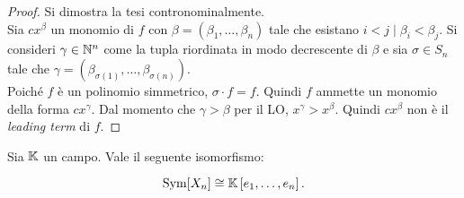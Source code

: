 \begin{proof}
    Si dimostra la tesi contronominalmente. \\
    
    Sia $c x^\beta$ un monomio di $f$ con $\beta = (\beta_1, \ldots, \beta_n)$ tale che esistano $i < j
    \mid \beta_i < \beta_j$. Si consideri $\gamma \in \mathbb N^n$ come
    la tupla riordinata in modo decrescente di $\beta$ e sia
    $\sigma \in S_n$ tale che $\gamma = (\beta_{\sigma(1)},
    \ldots, \beta_{\sigma(n)})$. \\
    
    Poiché $f$ è un polinomio simmetrico, $\sigma \cdot f = f$. Quindi
    $f$ ammette un monomio della forma $c x^\gamma$. Dal momento
    che $\gamma > \beta$ per il LO, $x^\gamma > x^\beta$. Quindi
    $c x^\beta$ non è il \textit{leading term} di $f$.
\end{proof}

\begin{theorem}
    Sia $\mathbb{K}$ un campo. Vale il seguente isomorfismo:
    
    \[ \operatorname{Sym}[X_n] \cong \mathbb{K}\left[e_1, \ldots, e_n\right]. \]
\end{theorem}

